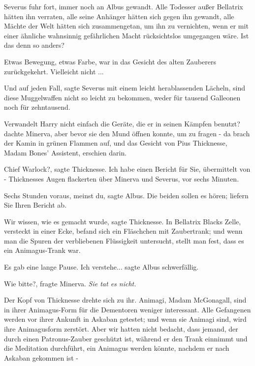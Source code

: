 Severus fuhr fort, immer noch an Albus gewandt. \glqq{}Alle Todesser außer
Bellatrix hätten ihn verraten, alle seine Anhänger hätten sich gegen ihn
gewandt, alle Mächte der Welt hätten sich zusammengetan, um ihn zu vernichten,
wenn er mit einer ähnliche wahnsinnig gefährlichen Macht rücksichtslos
umgegangen wäre. Ist das denn so anders?\grqq{}

Etwas Bewegung, etwas Farbe, war in das Gesicht des alten Zauberers
zurückgekehrt. \glqq{}Vielleicht nicht ...\grqq{}

\glqq{}Und auf jeden Fall\grqq{}, sagte Severus mit einem leicht herablassenden
Lächeln, \glqq{}sind diese Muggelwaffen nicht so leicht zu bekommen, weder für
tausend Galleonen noch für zehntausend.\grqq{}

Verwandelt Harry nicht einfach die Geräte, die er in seinen Kämpfen benutzt?
dachte Minerva, aber bevor sie den Mund öffnen konnte, um zu fragen - da brach
der Kamin in grünen Flammen auf, und das Gesicht von Pius Thicknesse, Madam
Bones' Assistent, erschien darin.

\glqq{}Chief Warlock?\grqq{}, sagte Thicknesse. \glqq{}Ich habe einen Bericht für
Sie, übermittelt von -\grqq{} Thicknesses Augen flackerten über Minerva und
Severus, \glqq{}vor sechs Minuten\grqq{}.

\glqq{}Sechs Stunden voraus, meinst du\grqq{}, sagte Albus. \glqq{}Die beiden
sollen es hören; liefern Sie Ihren Bericht ab.\grqq{}

\glqq{}Wir wissen, wie es gemacht wurde\grqq{}, sagte Thicknesse. \glqq{}In
Bellatrix Blacks Zelle, versteckt in einer Ecke, befand sich ein Fläschchen mit
Zaubertrank; und wenn man die Spuren der verbliebenen Flüssigkeit untersucht,
stellt man fest, dass es ein Animagus-Trank war.\grqq{}

Es gab eine lange Pause. \glqq{}Ich verstehe...\grqq{} sagte Albus schwerfällig.

\glqq{}Wie bitte?\grqq{}, fragte Minerva. \emph{Sie tat es nicht.}

Der Kopf von Thicknesse drehte sich zu ihr. \glqq{}Animagi, Madam McGonagall,
sind in ihrer Animagus-Form für die Dementoren weniger interessant. Alle
Gefangenen werden vor ihrer Ankunft in Askaban getestet; und wenn sie Animagi
sind, wird ihre Animagusform zerstört. Aber wir hatten nicht bedacht, dass
jemand, der durch einen Patronus-Zauber geschützt ist, während er den Trank
einnimmt und die Meditation durchführt, ein Animagus werden könnte, nachdem er
nach Askaban gekommen ist -\grqq{}

